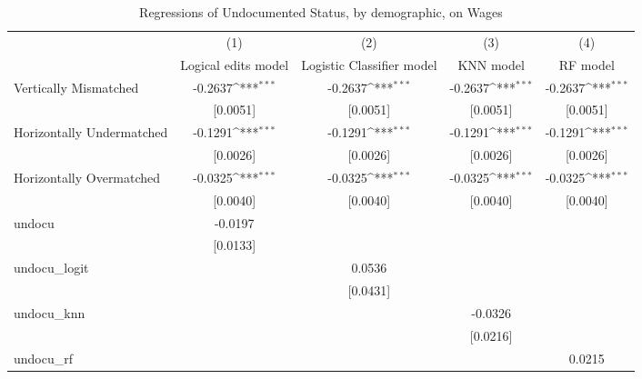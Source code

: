\begin{table}[htbp]\centering
\def\sym#1{\ifmmode^{#1}\else\(^{#1}\)\fi}
\caption{Regressions of Undocumented Status, by demographic, on Wages}
\begin{tabular}{l*{4}{c}}
\toprule
                    &\multicolumn{1}{c}{(1)}         &\multicolumn{1}{c}{(2)}         &\multicolumn{1}{c}{(3)}         &\multicolumn{1}{c}{(4)}         \\
                    &Logical edits model         &Logistic Classifier model         &   KNN model         &    RF model         \\
\midrule
Vertically Mismatched&     -0.2637\sym{***}&     -0.2637\sym{***}&     -0.2637\sym{***}&     -0.2637\sym{***}\\
                    &    [0.0051]         &    [0.0051]         &    [0.0051]         &    [0.0051]         \\
\addlinespace
Horizontally Undermatched&     -0.1291\sym{***}&     -0.1291\sym{***}&     -0.1291\sym{***}&     -0.1291\sym{***}\\
                    &    [0.0026]         &    [0.0026]         &    [0.0026]         &    [0.0026]         \\
\addlinespace
Horizontally Overmatched&     -0.0325\sym{***}&     -0.0325\sym{***}&     -0.0325\sym{***}&     -0.0325\sym{***}\\
                    &    [0.0040]         &    [0.0040]         &    [0.0040]         &    [0.0040]         \\
\addlinespace
undocu              &     -0.0197         &                     &                     &                     \\
                    &    [0.0133]         &                     &                     &                     \\
\addlinespace
undocu\_logit        &                     &      0.0536         &                     &                     \\
                    &                     &    [0.0431]         &                     &                     \\
\addlinespace
undocu\_knn          &                     &                     &     -0.0326         &                     \\
                    &                     &                     &    [0.0216]         &                     \\
\addlinespace
undocu\_rf           &                     &                     &                     &      0.0215         \\

\end{tabular}
\end{table}
